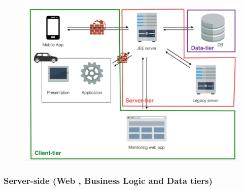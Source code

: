 \documentclass[]{article}
\begin{document}
\begin{figure}
\centering
\includegraphics[width=1.00000\textwidth,height=1.00000\textwidth]{./images/sysApp.png}
\caption{}\label{id}
\end{figure}

\subsubsection{Server-side (Web , Business Logic and Data
tiers)}\label{server-side-web-business-logic-and-data-tiers}
\end{document}
